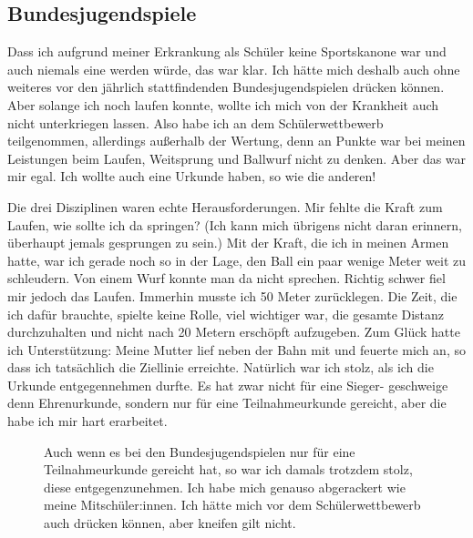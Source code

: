 \documentclass[fontsize=14pt,a4paper,headinclude,DIV=calc,automark]{scrbook}
\begin{document}
\subsection{Bundesjugendspiele}

Dass ich aufgrund meiner Erkrankung als Schüler keine Sportskanone war und auch niemals eine werden würde, das war klar. Ich hätte mich deshalb auch ohne weiteres vor den jährlich stattfindenden Bundesjugendspielen drücken können. Aber solange ich noch laufen konnte, wollte ich mich von der Krankheit auch nicht unterkriegen lassen. Also habe ich an dem Schülerwettbewerb teilgenommen, allerdings außerhalb der Wertung, denn an Punkte war bei meinen Leistungen beim Laufen, Weitsprung und Ballwurf nicht zu denken. Aber das war mir egal. Ich wollte auch eine Urkunde haben, so wie die anderen!

Die drei Disziplinen waren echte Herausforderungen. Mir fehlte die Kraft zum Laufen, wie sollte ich da springen? (Ich kann mich übrigens nicht daran erinnern, überhaupt jemals gesprungen zu sein.) Mit der Kraft, die ich in meinen Armen hatte, war ich gerade noch so in der Lage, den Ball ein paar wenige Meter weit zu schleudern. Von einem Wurf konnte man da nicht sprechen. Richtig schwer fiel mir jedoch das Laufen. Immerhin musste ich 50 Meter zurücklegen. Die Zeit, die ich dafür brauchte, spielte keine Rolle, viel wichtiger war, die gesamte Distanz durchzuhalten und nicht nach 20 Metern erschöpft aufzugeben. Zum Glück hatte ich Unterstützung: Meine Mutter lief neben der Bahn mit und feuerte mich an, so dass ich tatsächlich die Ziellinie erreichte. Natürlich war ich stolz, als ich die Urkunde entgegennehmen durfte. Es hat zwar nicht für eine Sieger- geschweige denn Ehrenurkunde, sondern nur für eine Teilnahmeurkunde gereicht, aber die habe ich mir hart erarbeitet.

\setlength{\fboxsep}{0pt}    %
\setlength{\fboxrule}{0.2pt} %
\begin{figure}[H]
    \raggedright
    \caption{Auch wenn es bei den Bundesjugendspielen nur für eine Teilnahmeurkunde gereicht hat, so war ich damals trotzdem stolz, diese entgegenzunehmen. Ich habe mich genauso abgerackert wie meine Mitschüler:innen. Ich hätte mich vor dem Schülerwettbewerb auch drücken können, aber kneifen gilt nicht.}
    \label{fig:bundesjugendspiele}
\end{figure}
\end{document}
